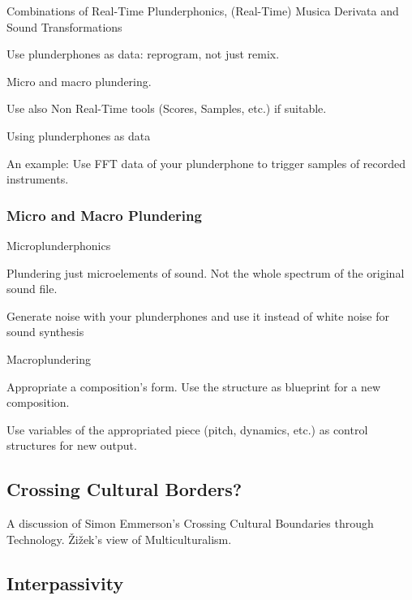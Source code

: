 Combinations of Real-Time Plunderphonics, (Real-Time) Musica Derivata and Sound Transformations

Use plunderphones as data: reprogram, not just remix.

Micro and macro plundering.

Use also Non Real-Time tools (Scores, Samples, etc.) if suitable. 

Using plunderphones as data

An example: Use FFT data of your plunderphone to trigger samples of recorded instruments.

\subsubsection{Micro and Macro Plundering}

Microplunderphonics

Plundering just microelements of sound. Not the whole spectrum of the original sound file. 

Generate noise with your plunderphones and use it instead of white noise for sound synthesis


Macroplundering

Appropriate a composition’s form. Use the structure as blueprint for a new composition. 

Use variables of the appropriated piece (pitch, dynamics, etc.) as control structures for new output.

\subsection{Crossing Cultural Borders?}

A discussion of Simon Emmerson's Crossing Cultural Boundaries through Technology. 
\v{Z}i\v{z}ek's view of Multiculturalism. 


\subsection{Interpassivity}


